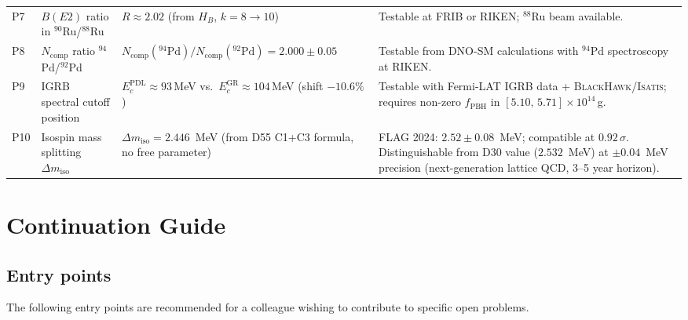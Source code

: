 \documentclass[11pt,a4paper]{article}
\theoremstyle{plain}
\theoremstyle{definition}
\theoremstyle{remark}
\begin{document}
\begin{longtable}{L{0.5cm}L{3.2cm}L{5.2cm}L{4.2cm}}
P7 & $B(E2)$ ratio in $^{90}$Ru/$^{88}$Ru & $R\approx 2.02$ (from $H_B$, $k=8\to10$) & Testable at FRIB or RIKEN; $^{88}$Ru beam available.\\[0.4em]
P8 & $N_{\mathrm{comp}}$ ratio $^{94}$Pd/$^{92}$Pd & $N_{\mathrm{comp}}(^{94}\mathrm{Pd})/N_{\mathrm{comp}}(^{92}\mathrm{Pd})=2.000\pm0.05$ & Testable from DNO-SM calculations with $^{94}$Pd spectroscopy at RIKEN.\\[0.4em]
P9 & IGRB spectral cutoff position & $E_c^{\mathrm{PDL}} \approx 93$\,MeV vs.\ $E_c^{\mathrm{GR}} \approx 104$\,MeV (shift $-10.6\%$) & Testable with Fermi-LAT IGRB data + \textsc{BlackHawk}/\textsc{Isatis}; requires non-zero $f_{\mathrm{PBH}}$ in $[5.10,\,5.71]\times10^{14}$\,g.\\[0.4em]
P10 & Isospin mass splitting $\Delta m_{\mathrm{iso}}$ & $\Delta m_{\mathrm{iso}} = 2.446$~MeV (from D55 C1+C3 formula, no free parameter) & FLAG 2024: $2.52 \pm 0.08$~MeV; compatible at $0.92\,\sigma$. Distinguishable from D30 value ($2.532$~MeV) at $\pm 0.04$~MeV precision (next-generation lattice QCD, 3--5 year horizon).\\[0.4em]
\end{longtable}

\section{Continuation Guide}
\label{sec:continuation}

\subsection{Entry points}
\label{subsec:entrypoints}
The following entry points are recommended for a colleague wishing to contribute to specific open problems.
\end{document}

